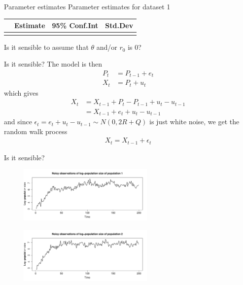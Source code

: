 \begin{frame}{Parameter estimates}
    Parameter estimates for dataset 1
    \begin{table}[htb]
        \begin{tabular}{lr|rr|r}
             & \multicolumn{1}{r}{Estimate} & \multicolumn{2}{c}{95\% Conf.Int} & Std.Dev \\\hline
             \\
        \end{tabular}
    \end{table}
    Is it sensible to assume that $\theta$ and/or $r_0$ is 0?\\
\end{frame}

\begin{frame}{Is it sensible?}
    The model is then
    \begin{align*}
        P_t &= P_{t-1} + e_t \\
        X_t &= P_t + u_t
    \end{align*}
    which gives
    \begin{align*}
        X_t &= X_{t-1} + P_t - P_{t-1} + u_t - u_{t-1} \\
        &= X_{t-1} + e_t + u_t - u_{t-1}
    \end{align*}
    and since $\epsilon_t = e_t + u_t - u_{t-1}\sim N(0, 2R+Q)$ is just white noise, we get the random walk process
    \begin{align*}
        X_t = X_{t-1} + \epsilon_t
    \end{align*}
\end{frame}

\begin{frame}{Is it sensible?}
    \begin{figure}
    \includegraphics[width=250px]{../plots/dataset-1.pdf}
    \end{figure}
    \begin{figure}
    \includegraphics[width=250px]{../plots/dataset-2.pdf}
    \end{figure}
\end{frame}

